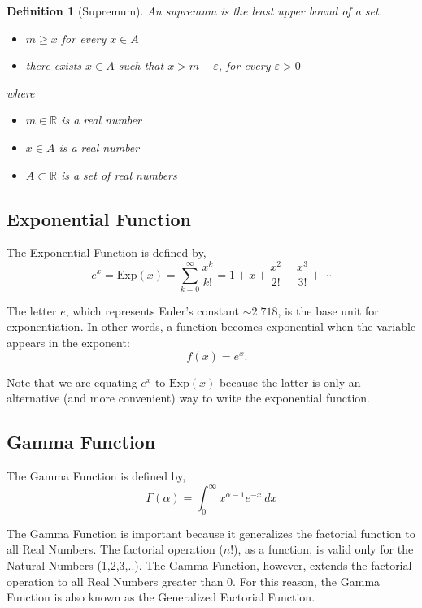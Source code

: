 \documentclass{article}
\newtheorem{definition}{Definition}
\begin{document}
\begin{mdframed}
\begin{definition}[Supremum]
An \emph{supremum} is the least upper bound of a set.
\begin{itemize}
    \item $m \geq x$ for every $x \in A$
    \item there exists $x \in A$ such that $x > m - \varepsilon$, for every $\varepsilon > 0$
\end{itemize}

where
\begin{itemize}
    \item $m \in \mathbb{R}$ is a real number
    \item $x \in A$ is a real number
    \item $A \subset \mathbb{R}$ is a set of real numbers
\end{itemize}
\end{definition}
\end{mdframed}





\subsection{Exponential Function}

The Exponential Function is defined by,
$$ e^x = \text{Exp}(x) = \sum_{k=0}^{\infty} \frac{x^k}{k!} = 1 + x + \frac{x^2}{2!} + \frac{x^3}{3!} + \cdots   $$

The letter $e$, which represents Euler's constant $\sim 2.718$, is the base unit for exponentiation. In other words, a function becomes exponential when the variable appears in the exponent:
$$\quad f(x) = e^x. $$

 
Note that we are equating $e^x$ to $\text{Exp}(x)$ because the latter is only an alternative (and more convenient) way to write the exponential function. 


\subsection{Gamma Function}

The Gamma Function is defined by,
$$ \Gamma(\alpha) = \int_0^\infty x^{\alpha-1} e^{-x} \: dx $$

The Gamma Function is important because it generalizes the factorial function to all Real Numbers. The factorial operation ($n!$), as a function, is valid only for the Natural Numbers (1,2,3,..). The Gamma Function, however, extends the factorial operation to all Real Numbers greater than 0. For this reason, the Gamma Function is also known as the Generalized Factorial Function.
\end{document}
